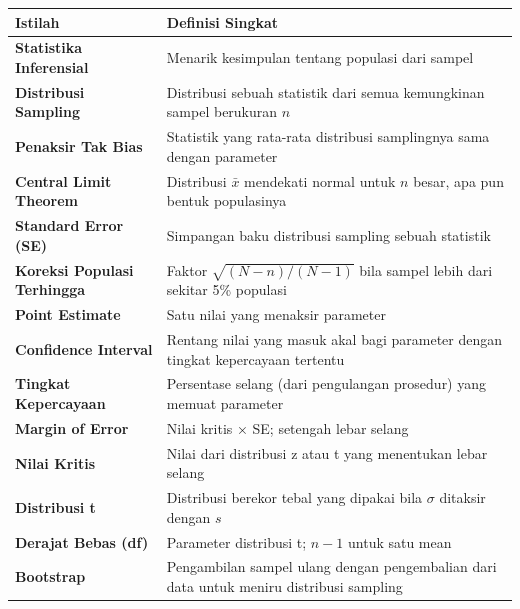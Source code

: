 \documentclass[
  indonesian,
  letterpaper,
]{book}
\newcounter{none} %
\begin{document}
{\def\LTcaptype{none} %
\begin{longtable}[]{@{}
  >{\raggedright\arraybackslash}p{}
  >{\raggedright\arraybackslash}p{}@{}}
\toprule\noalign{}
\begin{minipage}[b]{\linewidth}\raggedright
Istilah
\end{minipage} & \begin{minipage}[b]{\linewidth}\raggedright
Definisi Singkat
\end{minipage} \\
\midrule\noalign{}
\endhead
\bottomrule\noalign{}
\endlastfoot
\textbf{Statistika Inferensial} & Menarik kesimpulan tentang populasi
dari sampel \\
\textbf{Distribusi Sampling} & Distribusi sebuah statistik dari semua
kemungkinan sampel berukuran \(n\) \\
\textbf{Penaksir Tak Bias} & Statistik yang rata-rata distribusi
samplingnya sama dengan parameter \\
\textbf{Central Limit Theorem} & Distribusi \(\bar{x}\) mendekati normal
untuk \(n\) besar, apa pun bentuk populasinya \\
\textbf{Standard Error (SE)} & Simpangan baku distribusi sampling sebuah
statistik \\
\textbf{Koreksi Populasi Terhingga} & Faktor \(\sqrt{(N-n)/(N-1)}\) bila
sampel lebih dari sekitar 5\% populasi \\
\textbf{Point Estimate} & Satu nilai yang menaksir parameter \\
\textbf{Confidence Interval} & Rentang nilai yang masuk akal bagi
parameter dengan tingkat kepercayaan tertentu \\
\textbf{Tingkat Kepercayaan} & Persentase selang (dari pengulangan
prosedur) yang memuat parameter \\
\textbf{Margin of Error} & Nilai kritis × SE; setengah lebar selang \\
\textbf{Nilai Kritis} & Nilai dari distribusi z atau t yang menentukan
lebar selang \\
\textbf{Distribusi t} & Distribusi berekor tebal yang dipakai bila
\(\sigma\) ditaksir dengan \(s\) \\
\textbf{Derajat Bebas (df)} & Parameter distribusi t; \(n-1\) untuk satu
mean \\
\textbf{Bootstrap} & Pengambilan sampel ulang dengan pengembalian dari
data untuk meniru distribusi sampling \\
\end{longtable}
}
\end{document}
